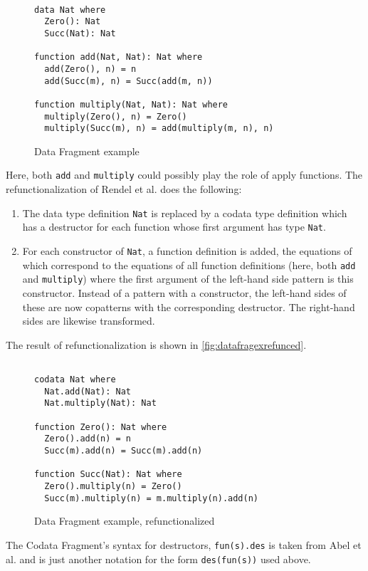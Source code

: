 \begin{figure}
\begin{lstlisting}

data Nat where
  Zero(): Nat
  Succ(Nat): Nat

function add(Nat, Nat): Nat where
  add(Zero(), n) = n
  add(Succ(m), n) = Succ(add(m, n))

function multiply(Nat, Nat): Nat where
  multiply(Zero(), n) = Zero()
  multiply(Succ(m), n) = add(multiply(m, n), n)

\end{lstlisting}
\caption{Data Fragment example}
\label{fig:datafragex}
\end{figure}

Here, both \texttt{add} and \texttt{multiply} could possibly play the role of apply functions. The refunctionalization of Rendel et al. does the following:
\begin{enumerate}
\item The data type definition \texttt{Nat} is replaced by a codata type definition which has a destructor for each function whose first argument has type \texttt{Nat}.
\item For each constructor of \texttt{Nat}, a function definition is added, the equations of which correspond to the equations of all function definitions (here, both \texttt{add} and \texttt{multiply}) where the first argument of the left-hand side pattern is this constructor. Instead of a pattern with a constructor, the left-hand sides of these are now copatterns with the corresponding destructor. The right-hand sides are likewise transformed.
\end{enumerate}
The result of refunctionalization is shown in \autoref{fig:datafragexrefunced}.

\begin{figure}
\begin{lstlisting}

codata Nat where
  Nat.add(Nat): Nat
  Nat.multiply(Nat): Nat

function Zero(): Nat where
  Zero().add(n) = n
  Succ(m).add(n) = Succ(m).add(n)

function Succ(Nat): Nat where
  Zero().multiply(n) = Zero()
  Succ(m).multiply(n) = m.multiply(n).add(n)

\end{lstlisting}
\caption{Data Fragment example, refunctionalized}
\label{fig:datafragexrefunced}
\end{figure}

The Codata Fragment's syntax for destructors, \texttt{fun(s).des} is taken from Abel et al.\cite{abel13copatterns} and is just another notation for the form \texttt{des(fun(s))} used above.

